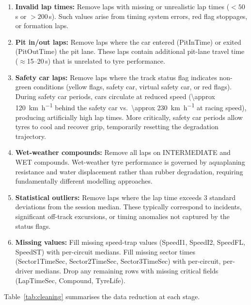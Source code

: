 \documentclass[journal,twoside]{IEEEtran}
\begin{document}
\begin{enumerate}
  \item \textbf{Invalid lap times:}  Remove laps with missing or
  unrealistic lap times ($<50$\,s or $>200$\,s).  Such values arise
  from timing system errors, red flag stoppages, or formation laps.

  \item \textbf{Pit in/out laps:}  Remove laps where the car entered
  (PitInTime) or exited (PitOutTime) the pit lane.  These laps contain
  additional pit-lane travel time ($\approx$15--20\,s) that is
  unrelated to tyre performance.

  \item \textbf{Safety car laps:}  Remove laps where the track status
  flag indicates non-green conditions (yellow flags, safety car, virtual
  safety car, or red flags).  During safety car periods, cars circulate
  at reduced speed (\SI{\approx 120}{\kilo\meter\per\hour} behind the
  safety car vs.\ \SI{\approx 230}{\kilo\meter\per\hour} at racing
  speed), producing artificially high lap times.  More critically,
  safety car periods allow tyres to cool and recover grip, temporarily
  resetting the degradation trajectory.

  \item \textbf{Wet-weather compounds:}  Remove all laps on
  INTERMEDIATE and WET compounds.  Wet-weather tyre performance is
  governed by aquaplaning resistance and water displacement rather than
  rubber degradation, requiring fundamentally different modelling
  approaches.

  \item \textbf{Statistical outliers:}  Remove laps where the lap time
  exceeds 3 standard deviations from the session median.  These
  typically correspond to incidents, significant off-track excursions,
  or timing anomalies not captured by the status flags.

  \item \textbf{Missing values:}  Fill missing speed-trap values
  (SpeedI1, SpeedI2, SpeedFL, SpeedST) with per-circuit medians.
  Fill missing sector times (Sector1TimeSec, Sector2TimeSec,
  Sector3TimeSec) with per-circuit, per-driver medians.  Drop any
  remaining rows with missing critical fields (LapTimeSec, Compound,
  TyreLife).
\end{enumerate}

Table~\ref{tab:cleaning} summarises the data reduction at each stage.
\end{document}
